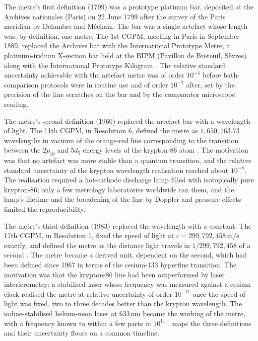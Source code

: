 The metre's first definition (1799) was a prototype platinum bar,
deposited at the Archives nationales (Paris) on 22 June 1799 after
the survey of the Paris meridian by Delambre and M\'echain. The bar
was a single artefact whose length was, by definition, one metre.
The 1st CGPM, meeting in Paris in September 1889, replaced the
Archives bar with the International Prototype Metre, a
platinum-iridium X-section bar held at the BIPM (Pavillon de
Breteuil, S\`evres) along with the International Prototype Kilogram
\cite{ch07t3-web:bipm-cgpm-1889-prototype}. The relative standard
uncertainty achievable with the artefact metre was of order
$10^{-4}$ before bath-comparison protocols were in routine use and
of order $10^{-7}$ after, set by the precision of the line scratches
on the bar and by the comparator microscope reading.



The metre's second definition (1960) replaced the artefact bar with
a wavelength of light. The 11th CGPM, in Resolution 6, defined the
metre as $1{,}650{,}763.73$ wavelengths in vacuum of the orange-red
line corresponding to the transition between the $2p_{10}$ and
$5d_{5}$ energy levels of the krypton-86 atom
\cite{ch07t3-web:bipm-cgpm-1960-krypton-metre}. The motivation was
that no artefact was more stable than a quantum transition, and the
relative standard uncertainty of the krypton wavelength realisation
reached about $10^{-8}$. The realisation required a hot-cathode
discharge lamp filled with isotopically pure krypton-86; only a few
metrology laboratories worldwide ran them, and the lamp's lifetime
and the broadening of the line by Doppler and pressure effects
limited the reproducibility.

The metre's third definition (1983) replaced the wavelength with a
constant. The 17th CGPM, in Resolution 1, fixed the speed of light
at $c = 299{,}792{,}458 \,\si{\meter\per\second}$ exactly, and
defined the metre as the distance light travels in
$1/299{,}792{,}458$ of a second
\cite{ch07t3-web:bipm-cgpm-1983-speed-of-light-metre}. The metre
became a derived unit, dependent on the second, which had been
defined since 1967 in terms of the cesium-133 hyperfine transition.
The motivation was that the krypton-86 line had been outperformed
by laser interferometry: a stabilised laser whose frequency was
measured against a cesium clock realised the metre at relative
uncertainty of order $10^{-11}$ once the speed of light was fixed,
two to three decades better than the krypton wavelength. The
iodine-stabilised helium-neon laser at $633 \,\si{\nano\meter}$
became the working  of the metre, with a
frequency known to within a few parts in $10^{11}$
\cite{web:bipm-mise-en-pratique-kilogram-2019}.
 maps the three definitions and
their uncertainty floors on a common timeline.

